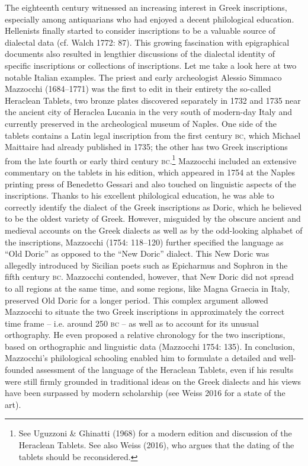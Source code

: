 \begin{styleStandard}
The eighteenth century witnessed an increasing interest in Greek inscriptions, especially among antiquarians who had enjoyed a decent philological education. Hellenists finally started to consider inscriptions to be a valuable source of dialectal data (cf. Walch 1772: 87). This growing fascination with epigraphical documents also resulted in lengthier discussions of the dialectal identity of specific inscriptions or collections of inscriptions. Let me take a look here at two notable Italian examples. The priest and early archeologist Alessio Simmaco Mazzocchi (1684–1771) was the first to edit in their entirety the so-called Heraclean Tablets, two bronze plates discovered separately in 1732 and 1735 near the ancient city of Heraclea Lucania in the very south of modern-day Italy and currently preserved in the archeological museum of Naples. One side of the tablets contains a Latin legal inscription from the first century \textsc{bc}, which Michael Maittaire had already published in 1735; the other has two Greek inscriptions from the late fourth or early third century \textsc{bc}.\footnote{ See Uguzzoni \& Ghinatti (1968) for a modern edition and discussion of the Heraclean Tablets. See also Weiss (2016), who argues that the dating of the tablets should be reconsidered.} Mazzocchi included an extensive commentary on the tablets in his edition, which appeared in 1754 at the Naples printing press of Benedetto Gessari and also touched on linguistic aspects of the inscriptions. Thanks to his excellent philological education, he was able to correctly identify the dialect of the Greek inscriptions as Doric, which he believed to be the oldest variety of Greek. However, misguided by the obscure ancient and medieval accounts on the Greek dialects as well as by the odd-looking alphabet of the inscriptions, Mazzocchi (1754: 118–120) further specified the language as “Old Doric” as opposed to the “New Doric” dialect. This New Doric was allegedly introduced by Sicilian poets such as Epicharmus and Sophron in the fifth century \textsc{bc}. Mazzocchi contended, however, that New Doric did not spread to all regions at the same time, and some regions, like Magna Graecia in Italy, preserved Old Doric for a longer period. This complex argument allowed Mazzocchi to situate the two Greek inscriptions in approximately the correct time frame – i.e. around 250 \textsc{bc} – as well as to account for its unusual orthography. He even proposed a relative chronology for the two inscriptions, based on orthographic and linguistic data (Mazzocchi 1754: 135). In conclusion, Mazzocchi’s philological schooling enabled him to formulate a detailed and well-founded assessment of the language of the Heraclean Tablets, even if his results were still firmly grounded in traditional ideas on the Greek dialects and his views have been surpassed by modern scholarship (see Weiss 2016 for a state of the art).
\end{styleStandard}

